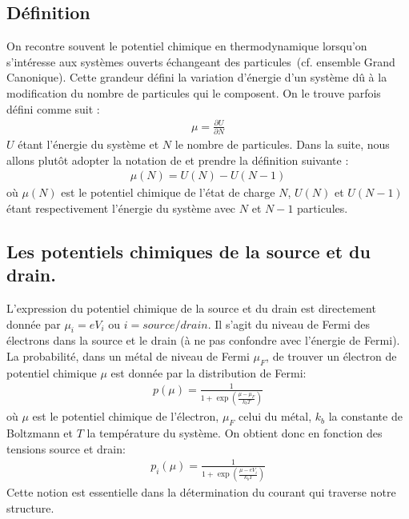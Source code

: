 \subsection{Définition}

On recontre souvent le potentiel chimique en thermodynamique lorsqu'on s'intéresse aux systèmes ouverts échangeant des particules~(cf. ensemble Grand Canonique). Cette grandeur défini la variation d'énergie d'un système d\^u à la modification du nombre de particules qui le composent. On le trouve parfois défini comme suit :
\begin{eqnarray}
\mu = \frac{\partial U}{\partial N} \nonumber
\end{eqnarray}
$U$ étant l'énergie du système et $N$ le nombre de particules. Dans la suite, nous allons plut\^ot adopter la notation de \cite{Hanson2007} et prendre la définition suivante :
\begin{eqnarray}
\mu(N) = U(N) - U(N-1)
\end{eqnarray}
où $\mu(N)$ est le potentiel chimique de l'état de charge $N$, $U(N)$ et $U(N-1)$ étant respectivement l'énergie du système avec $N$ et $N-1$ particules.


\subsection{Les potentiels chimiques de la source et du drain.}
L'expression du potentiel chimique de la source et du drain est directement donnée par $\mu_i = e V_i$ ou $i=source/drain$. Il s'agit du niveau de Fermi des électrons dans la source et le drain (à ne pas confondre avec l'énergie de Fermi). La probabilité, dans un métal de niveau de Fermi $\mu_F$, de trouver un électron de potentiel chimique $\mu$ est donnée par la distribution de Fermi:
\begin{eqnarray}
p(\mu) = \frac{1}{1 + \exp{(\frac{\mu - \mu_F}{k_bT})}} \nonumber
\end{eqnarray}
où $\mu$ est le potentiel chimique de l'électron, $\mu_F$ celui du métal, $k_b$ la constante de Boltzmann et $T$ la température du système. On obtient donc en fonction des tensions source et drain:
\begin{eqnarray}
p_i(\mu) = \frac{1}{1 + \exp{(\frac{\mu - eV_i}{k_bT})}}
\end{eqnarray}
Cette notion est essentielle dans la détermination du courant qui traverse notre structure.

